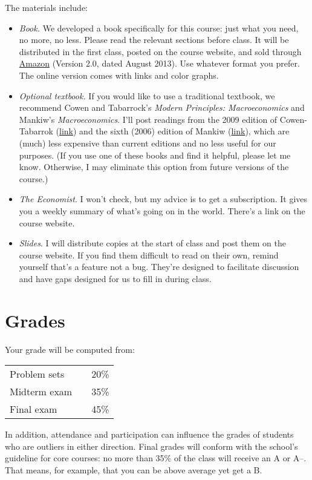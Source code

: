 \documentclass[12pt]{article}
\begin{document}
The materials include:
%
\begin{itemize}
\item {\it Book.\/}
We developed a book specifically for this course:
just what you need, no more, no less.
Please read the relevant sections before class.
It will be distributed in the first class,
posted on the course website,
and sold through
\href{http://www.amazon.com/dp/0615871038/}{Amazon}
(Version 2.0, dated August 2013).
Use whatever format you prefer.
The online version comes with links and color graphs.

\item {\it Optional textbook.\/}
If you would like to use a traditional textbook, we recommend
Cowen and Tabarrock's {\it Modern Principles:  Macroeconomics\/}
and Mankiw's {\it Macroeconomics\/}.
I'll post readings from the 2009 edition of
Cowen-Tabarrok
(\href{http://www.amazon.com/Modern-Principles-Macroeconomics-Tyler-Cowen/dp/1429202491}{link})
and the sixth (2006) edition of Mankiw
(\href{http://www.amazon.com/Macroeconomics-N-Gregory-Mankiw/dp/0716767112/}{link}),
which are (much) less expensive than current editions
and no less useful for our purposes.
(If you use one of these books and find it helpful, please let me know.
Otherwise, I may eliminate this option from future versions of the course.)


\item {\it The Economist\/}.
I won't check, but my advice is to get a subscription.
It gives you a weekly summary of what's going on in the world.
There's a link on the course website.

\item {\it Slides\/}.
I will distribute copies at the start of class and post them on the course website.
If you find them difficult to read on their own,
remind yourself that's a feature not a bug.
They're designed to facilitate discussion
and have gaps designed for us to fill in during class.
\end{itemize}


\section{Grades}

Your grade will be computed from:
%
\begin{center}
\begin{tabular}{lcc}
    Problem sets   &&  20\% \\
    Midterm exam   &&  35\% \\
    Final exam     &&  45\%
\end{tabular}
\end{center}
%
In addition, attendance and participation can influence
the grades of students who are outliers in either direction.
Final grades will conform with the school's guideline for core courses:
no more than 35\% of the class will receive an A or A--.
That means, for example, that you can be above average yet get a B.
\end{document}
